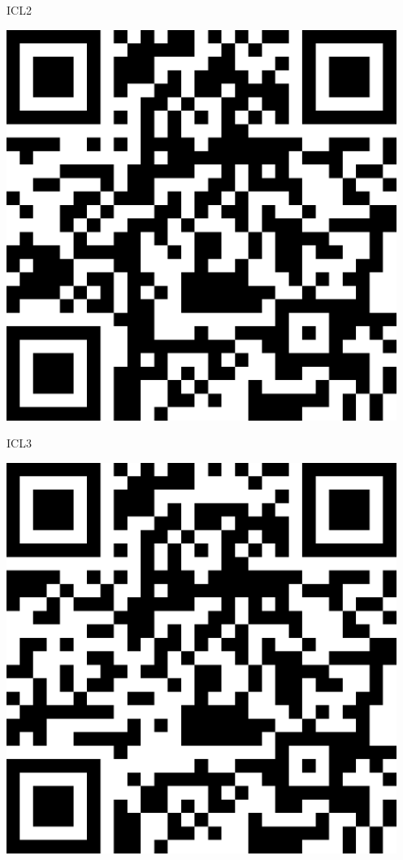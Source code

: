 \documentclass[letterpaper]{article}
\begin{document}
 \hfill{\small ICL2} 

 \vspace{1in} 
 \pagebreak 
{} 
 \vspace*{\fill} 
 \begingroup 
 \centerline{\includegraphics[scale=1,width=5in,height=5in]{ICL3.png}} 
 \endgroup 
 \vspace*{\fill} 

 \hfill{\small ICL3} 

 \vspace{1in} 
 \pagebreak 
{} 
 \vspace*{\fill} 
 \begingroup 
 \centerline{\includegraphics[scale=1,width=5in,height=5in]{ICL4.png}} 
 \endgroup 
 \vspace*{\fill} 
\end{document}
